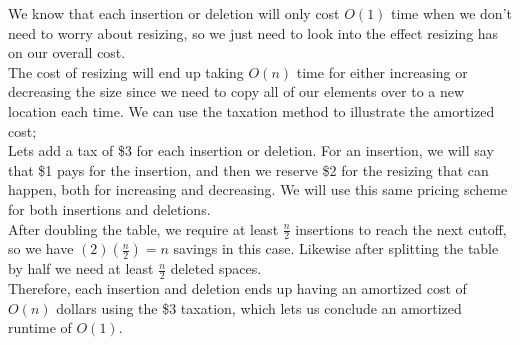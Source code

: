 \documentclass{article}
\begin{document}
\begin{enumerate}
We know that each insertion or deletion will only cost $O(1)$ time when we don't need to worry about resizing, so we just need to look into the effect resizing has on our overall cost. \\
\newline 
The cost of resizing will end up taking $O(n)$ time for either increasing or decreasing the size since we need to copy all of our elements over to a new location each time. We can use the taxation method to illustrate the amortized cost; \\
\newline 
Lets add a tax of \$3 for each insertion or deletion. For an insertion, we will say that \$1 pays for the insertion, and then we reserve \$2 for the resizing that can happen, both for increasing and decreasing. We will use this same pricing scheme for both insertions and deletions. \\
\newline 
After doubling the table, we require at least $\frac{n}{2}$ insertions to reach the next cutoff, so we have $(2)(\frac{n}{2}) = n$ savings in this case. Likewise after splitting the table by half we need at least $\frac{n}{2}$ deleted spaces. \\
\newline 
Therefore, each insertion and deletion ends up having an amortized cost of $O(n)$ dollars using the \$3 taxation, which lets us conclude an amortized runtime of $O(1)$.    
\end{enumerate}
\end{document}
